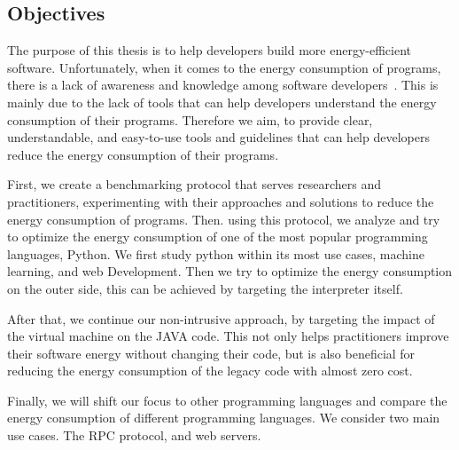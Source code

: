 \subsection*{Objectives}

The purpose of this thesis is to help developers build more energy-efficient software. Unfortunately, when it comes to the energy consumption of programs, there is a lack of awareness and knowledge among software developers~\cite{ournani2020reducing,pang2015programmers,pinto2014mining}. This is mainly due to the lack of tools that can help developers understand the energy consumption of their programs. Therefore we aim, to provide clear, understandable, and easy-to-use tools and guidelines that can help developers reduce the energy consumption of their programs. 

First, we create a benchmarking protocol that serves researchers and practitioners, experimenting with their approaches and solutions to reduce the energy consumption of programs. 
Then. using this protocol, we analyze and try to optimize the energy consumption of one of the most popular programming languages, Python. We first study python within its most use cases, machine learning, and web Development. Then we try to optimize the energy consumption on the outer side, this can be achieved by targeting the interpreter itself. 

After that, we continue our non-intrusive approach, by targeting the impact of the virtual machine on the JAVA code. This not only helps practitioners improve their software energy without changing their code, but is also beneficial for reducing the energy consumption of the legacy code with almost zero cost. 

Finally, we will shift our focus to other programming languages and compare the energy consumption of different programming languages. 
We consider two main use cases. The RPC protocol, and web servers.



